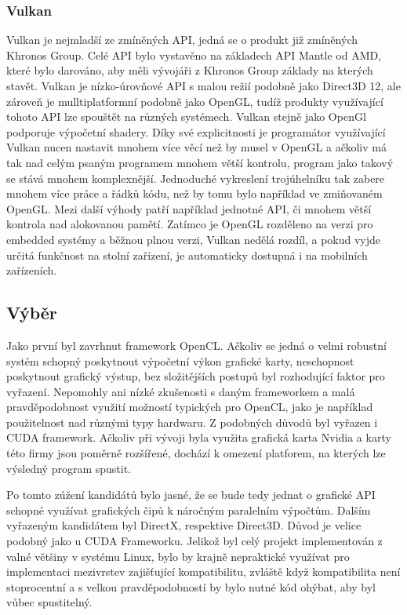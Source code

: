 \subsubsection{Vulkan}
Vulkan je nejmladší ze zmíněných API, jedná se o produkt již zmíněných Khronos Group. Celé API bylo vystavěno na základech API Mantle od AMD, které bylo darováno, aby měli vývojáři z Khronos Group základy na kterých stavět. Vulkan je nízko-úrovňové API s malou režií podobně jako Direct3D 12, ale zároveň je mulltiplatformní podobně jako OpenGL, tudíž produkty využívající tohoto API lze spouštět na různých systémech. Vulkan stejně jako OpenGl podporuje výpočetní shadery. Díky své explicitnosti je programátor využívající Vulkan nucen nastavit mnohem více věcí než by musel v OpenGL a ačkoliv má tak nad celým psaným programem mnohem větší kontrolu, program jako takový se stává mnohem komplexnější. Jednoduché vykreslení trojúhelníku tak zabere mnohem více práce a řádků kódu, než by tomu bylo například ve zmiňovaném OpenGL. Mezi další výhody patří například jednotné API, či mnohem větší kontrola nad alokovanou pamětí. Zatímco je OpenGL rozděleno na verzi pro embedded systémy a běžnou plnou verzi, Vulkan nedělá rozdíl, a pokud vyjde určitá funkčnost na stolní zařízení, je automaticky dostupná i na mobilních zařízeních. \cite{singh2016learning}

\subsection{Výběr}
Jako první byl zavrhnut framework OpenCL. Ačkoliv se jedná o velmi robustní systém schopný poskytnout výpočetní výkon grafické karty, neschopnost poskytnout grafický výstup, bez složitějších postupů byl rozhodující faktor pro vyřazení. Nepomohly ani nízké zkušenosti s daným frameworkem a malá pravděpodobnost využití možností typických pro OpenCL, jako je například použitelnost nad různými typy hardwaru. Z podobných důvodů byl vyřazen i CUDA framework. Ačkoliv při vývoji byla využita grafická karta Nvidia a karty této firmy jsou poměrně rozšířené, dochází k omezení platforem, na kterých lze výsledný program spustit.

Po tomto zúžení kandidátů bylo jasné, že se bude tedy jednat o grafické API schopné využívat grafických čipů k náročným paralelním výpočtům. Dalším vyřazeným kandidátem byl DirectX, respektive Direct3D. Důvod je velice podobný jako u CUDA Frameworku. Jelikož byl celý projekt implementován z valné většiny v systému Linux, bylo by krajně nepraktické využívat pro implementaci mezivrstev zajišťující kompatibilitu, zvláště když kompatibilita není stoprocentní a s velkou pravděpodobností by bylo nutné kód ohýbat, aby byl vůbec spustitelný. 


